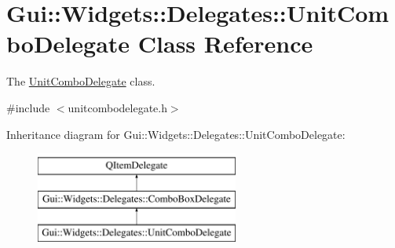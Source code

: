 \hypertarget{classGui_1_1Widgets_1_1Delegates_1_1UnitComboDelegate}{}\section{Gui\+:\+:Widgets\+:\+:Delegates\+:\+:Unit\+Combo\+Delegate Class Reference}
\label{classGui_1_1Widgets_1_1Delegates_1_1UnitComboDelegate}


The \hyperlink{classGui_1_1Widgets_1_1Delegates_1_1UnitComboDelegate}{Unit\+Combo\+Delegate} class.  




{\ttfamily \#include $<$unitcombodelegate.\+h$>$}

Inheritance diagram for Gui\+:\+:Widgets\+:\+:Delegates\+:\+:Unit\+Combo\+Delegate\+:\begin{figure}[H]
\begin{center}
\leavevmode
\includegraphics[height=3.000000cm]{db/def/classGui_1_1Widgets_1_1Delegates_1_1UnitComboDelegate}
\end{center}
\end{figure}

